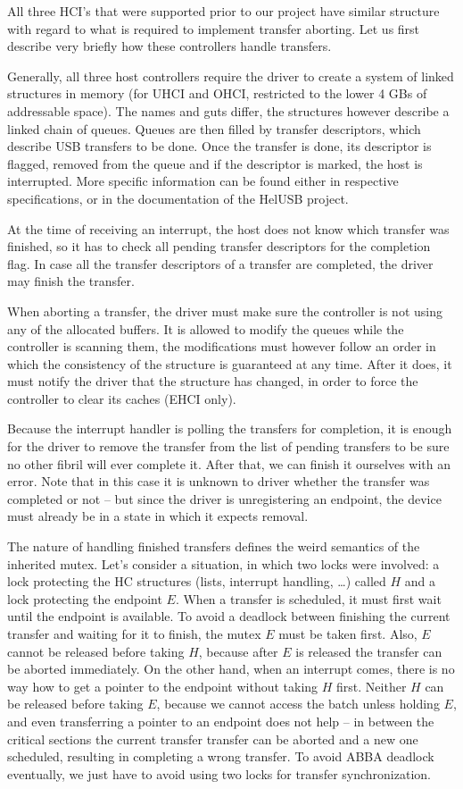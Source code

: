 All three HCI's that were supported prior to our project have similar
structure with regard to what is required to implement transfer aborting. Let us
first describe very briefly how these controllers handle transfers.

Generally, all three host controllers require the driver to create a system of
linked structures in memory (for UHCI and OHCI, restricted to the lower 4 GBs
of addressable space). The names and guts differ, the structures however
describe a linked chain of queues. Queues are then filled by transfer
descriptors, which describe USB transfers to be done. Once the transfer is
done, its descriptor is flagged, removed from the queue and if the descriptor
is marked, the host is interrupted. More specific information can be found
either in respective specifications, or in the documentation of the HelUSB
project.

At the time of receiving an interrupt, the host does not know which transfer
was finished, so it has to check all pending transfer descriptors for the
completion flag. In case all the transfer descriptors of a transfer are
completed, the driver may finish the transfer.

When aborting a transfer, the driver must make sure the controller is not using
any of the allocated buffers. It is allowed to modify the queues while the
controller is scanning them, the modifications must however follow an order in
which the consistency of the structure is guaranteed at any time. After it
does, it must notify the driver that the structure has changed, in order to
force the controller to clear its caches (EHCI only).

Because the interrupt handler is polling the transfers for completion, it is
enough for the driver to remove the transfer from the list of pending transfers
to be sure no other fibril will ever complete it. After that, we can finish it
ourselves with an error. Note that in this case it is unknown to driver whether
the transfer was completed or not -- but since the driver is unregistering an
endpoint, the device must already be in a state in which it expects removal.

The nature of handling finished transfers defines the weird semantics of the
inherited mutex. Let's consider a situation, in which two locks were involved:
a lock protecting the HC structures (lists, interrupt handling, \dots) called
$H$ and a lock protecting the endpoint $E$. When a transfer is scheduled, it
must first wait until the endpoint is available. To avoid a deadlock between
finishing the current transfer and waiting for it to finish, the mutex $E$ must
be taken first. Also, $E$ cannot be released before taking $H$, because after
$E$ is released the transfer can be aborted immediately. On the other hand, when
an interrupt comes, there is no way how to get a pointer to the endpoint without
taking $H$ first. Neither $H$ can be released before taking $E$, because
we cannot access the batch unless holding $E$, and even transferring a pointer
to an endpoint does not help -- in between the critical sections the current
transfer transfer can be aborted and a new one scheduled, resulting in
completing a wrong transfer. To avoid ABBA deadlock eventually, we just have to
avoid using two locks for transfer synchronization.

